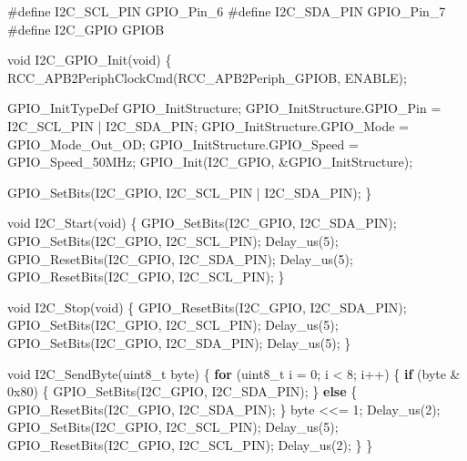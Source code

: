 \documentclass[
]{article}
\newenvironment{Shaded}{}{}
\newcommand{\BaseNTok}[1]{\textcolor[rgb]{0.25,0.63,0.44}{#1}}
\newcommand{\ControlFlowTok}[1]{\textcolor[rgb]{0.00,0.44,0.13}{\textbf{#1}}}
\newcommand{\DataTypeTok}[1]{\textcolor[rgb]{0.56,0.13,0.00}{#1}}
\newcommand{\DecValTok}[1]{\textcolor[rgb]{0.25,0.63,0.44}{#1}}
\newcommand{\NormalTok}[1]{#1}
\newcommand{\PreprocessorTok}[1]{\textcolor[rgb]{0.74,0.48,0.00}{#1}}
\begin{document}
\begin{Shaded}
\begin{Highlighting}[]
\PreprocessorTok{\#define I2C\_SCL\_PIN GPIO\_Pin\_6}
\PreprocessorTok{\#define I2C\_SDA\_PIN GPIO\_Pin\_7}
\PreprocessorTok{\#define I2C\_GPIO GPIOB}

\DataTypeTok{void}\NormalTok{ I2C\_GPIO\_Init(}\DataTypeTok{void}\NormalTok{)}
\NormalTok{\{}
\NormalTok{    RCC\_APB2PeriphClockCmd(RCC\_APB2Periph\_GPIOB, ENABLE);}
    
\NormalTok{    GPIO\_InitTypeDef GPIO\_InitStructure;}
\NormalTok{    GPIO\_InitStructure.GPIO\_Pin = I2C\_SCL\_PIN | I2C\_SDA\_PIN;}
\NormalTok{    GPIO\_InitStructure.GPIO\_Mode = GPIO\_Mode\_Out\_OD;}
\NormalTok{    GPIO\_InitStructure.GPIO\_Speed = GPIO\_Speed\_50MHz;}
\NormalTok{    GPIO\_Init(I2C\_GPIO, \&GPIO\_InitStructure);}
    
\NormalTok{    GPIO\_SetBits(I2C\_GPIO, I2C\_SCL\_PIN | I2C\_SDA\_PIN);}
\NormalTok{\}}

\DataTypeTok{void}\NormalTok{ I2C\_Start(}\DataTypeTok{void}\NormalTok{)}
\NormalTok{\{}
\NormalTok{    GPIO\_SetBits(I2C\_GPIO, I2C\_SDA\_PIN);}
\NormalTok{    GPIO\_SetBits(I2C\_GPIO, I2C\_SCL\_PIN);}
\NormalTok{    Delay\_us(}\DecValTok{5}\NormalTok{);}
\NormalTok{    GPIO\_ResetBits(I2C\_GPIO, I2C\_SDA\_PIN);}
\NormalTok{    Delay\_us(}\DecValTok{5}\NormalTok{);}
\NormalTok{    GPIO\_ResetBits(I2C\_GPIO, I2C\_SCL\_PIN);}
\NormalTok{\}}

\DataTypeTok{void}\NormalTok{ I2C\_Stop(}\DataTypeTok{void}\NormalTok{)}
\NormalTok{\{}
\NormalTok{    GPIO\_ResetBits(I2C\_GPIO, I2C\_SDA\_PIN);}
\NormalTok{    GPIO\_SetBits(I2C\_GPIO, I2C\_SCL\_PIN);}
\NormalTok{    Delay\_us(}\DecValTok{5}\NormalTok{);}
\NormalTok{    GPIO\_SetBits(I2C\_GPIO, I2C\_SDA\_PIN);}
\NormalTok{    Delay\_us(}\DecValTok{5}\NormalTok{);}
\NormalTok{\}}

\DataTypeTok{void}\NormalTok{ I2C\_SendByte(}\DataTypeTok{uint8\_t}\NormalTok{ byte)}
\NormalTok{\{}
    \ControlFlowTok{for}\NormalTok{ (}\DataTypeTok{uint8\_t}\NormalTok{ i = }\DecValTok{0}\NormalTok{; i \textless{} }\DecValTok{8}\NormalTok{; i++) \{}
        \ControlFlowTok{if}\NormalTok{ (byte \& }\BaseNTok{0x80}\NormalTok{) \{}
\NormalTok{            GPIO\_SetBits(I2C\_GPIO, I2C\_SDA\_PIN);}
\NormalTok{        \} }\ControlFlowTok{else}\NormalTok{ \{}
\NormalTok{            GPIO\_ResetBits(I2C\_GPIO, I2C\_SDA\_PIN);}
\NormalTok{        \}}
\NormalTok{        byte \textless{}\textless{}= }\DecValTok{1}\NormalTok{;}
\NormalTok{        Delay\_us(}\DecValTok{2}\NormalTok{);}
\NormalTok{        GPIO\_SetBits(I2C\_GPIO, I2C\_SCL\_PIN);}
\NormalTok{        Delay\_us(}\DecValTok{5}\NormalTok{);}
\NormalTok{        GPIO\_ResetBits(I2C\_GPIO, I2C\_SCL\_PIN);}
\NormalTok{        Delay\_us(}\DecValTok{2}\NormalTok{);}
\NormalTok{    \}}
\NormalTok{\}}


\end{Highlighting}
\end{Shaded}
\end{document}
